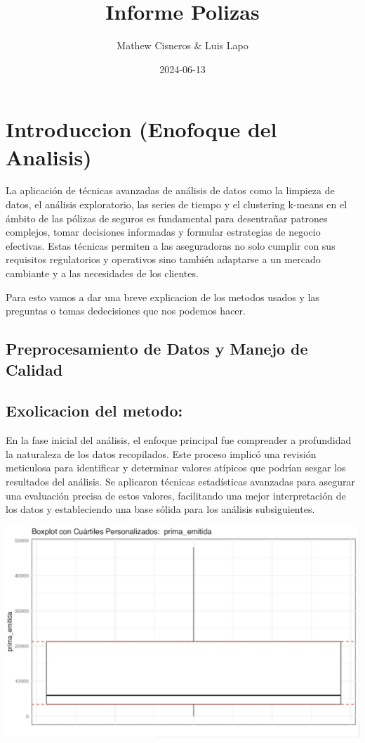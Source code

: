 \documentclass[
]{article}
\title{Informe Polizas}
\author{Mathew Cisneros \& Luis Lapo}
\date{2024-06-13}
\begin{document}
\maketitle

\section{Introduccion (Enofoque del
Analisis)}\label{introduccion-enofoque-del-analisis}

La aplicación de técnicas avanzadas de análisis de datos como la
limpieza de datos, el análisis exploratorio, las series de tiempo y el
clustering k-means en el ámbito de las pólizas de seguros es fundamental
para desentrañar patrones complejos, tomar decisiones informadas y
formular estrategias de negocio efectivas. Estas técnicas permiten a las
aseguradoras no solo cumplir con sus requisitos regulatorios y
operativos sino también adaptarse a un mercado cambiante y a las
necesidades de los clientes.

Para esto vamos a dar una breve explicacion de los metodos usados y las
preguntas o tomas dedecisiones que nos podemos hacer.

\subsection{Preprocesamiento de Datos y Manejo de
Calidad}\label{preprocesamiento-de-datos-y-manejo-de-calidad}

\subsection{Exolicacion del metodo:}\label{exolicacion-del-metodo}

En la fase inicial del análisis, el enfoque principal fue comprender a
profundidad la naturaleza de los datos recopilados. Este proceso implicó
una revisión meticulosa para identificar y determinar valores atípicos
que podrían sesgar los resultados del análisis. Se aplicaron técnicas
estadísticas avanzadas para asegurar una evaluación precisa de estos
valores, facilitando una mejor interpretación de los datos y
estableciendo una base sólida para los análisis subsiguientes.

\includegraphics{PHOTO-2024-06-13-15-00-55.jpg}
\end{document}
